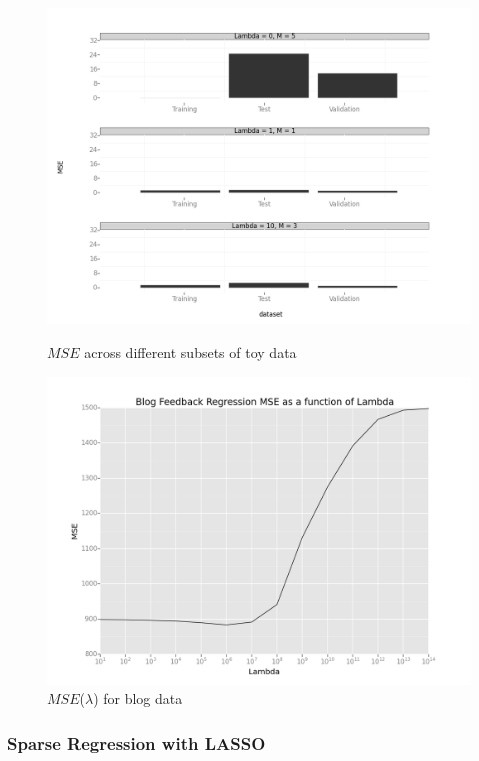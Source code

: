 \documentclass[10pt]{article}
\begin{document}
\begin{figure}[ht]
	\centering
	\begin{minipage}[b]{.48\linewidth}
                \includegraphics[width=1\linewidth]{MSE_comparison.png}
                \caption*{$MSE$ across different subsets of toy data}                
	\end{minipage}
	\begin{minipage}[b]{.48\linewidth}
                \includegraphics[width=1\linewidth]{BlogFeedbackRegressionMSE.png}
                \caption*{$MSE$($\lambda$) for blog data}
	\end{minipage}
\end{figure}

\subsubsection*{Sparse Regression with LASSO}
\end{document}
